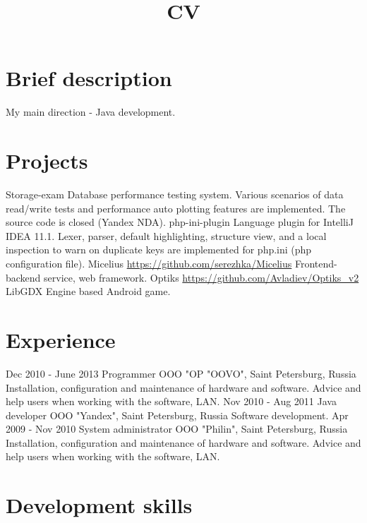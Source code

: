 \documentclass[11pt,a4paper,russian]{moderncv}
\title{CV}
\begin{document}
\maketitle

\section{Brief description}
\cvline
  {}
  {My main direction - Java development.}

\section{Projects}
\cvline
  {Storage-exam}
  {Database performance testing system.\newline{} 
  Various scenarios of data read/write tests and performance auto plotting  \newline{}
  features are implemented. The source code is closed (Yandex NDA).}
\cvline
  {php-ini-plugin}
  {Language plugin for IntelliJ IDEA 11.1. \newline{} 
  Lexer, parser, default highlighting, structure view, and a local inspection to warn on duplicate keys are implemented for   php.ini (php configuration file).}  
\cvline
  {Micelius}
  {\url{https://github.com/serezhka/Micelius}\newline{}
  Frontend-backend service, web framework.}
\cvline
  {Optiks}
  {\url{https://github.com/Avladiev/Optiks_v2}\newline{}
  LibGDX Engine based Android game.}

\section{Experience}
\cventry
  {Dec 2010 - June 2013}
  {Programmer}
  {OOO "OP "OOVO", Saint Petersburg, Russia}
  {}{}
  {Installation, configuration and maintenance of hardware and software. 
  \newline{}Advice and help users when working with the software, LAN.}
\cventry
  {Nov 2010 - Aug 2011}
  {Java developer}
  {OOO "Yandex", Saint Petersburg, Russia}
  {}{}
  {Software development.}
\cventry
  {Apr 2009 - Nov 2010}
  {System administrator}
  {OOO "Philin", Saint Petersburg, Russia}
  {}{}
  {Installation, configuration and maintenance of hardware and software. 
  \newline{}Advice and help users when working with the software, LAN.} 

\section{Development skills}
\end{document}
